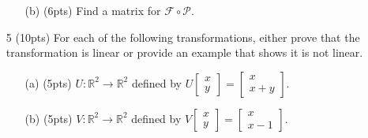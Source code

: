 \documentclass{article}
\newcommand{\R}{\mathbb{R}}
\newcommand{\mat}[1]{\begin{bmatrix}#1\end{bmatrix}}
\begin{document}
\begin{enumerate}
\begin{enumerate}
		\vspace{1in}

		\item[(b) (6pts)] Find a matrix for $\mathcal F\circ \mathcal P$.
			\vspace{5in}
	\end{enumerate}
	\clearpage

	\item[5 (10pts)] For each of the following transformations, either prove that the transformation is linear
		or provide an example that shows it is not linear.
	\begin{enumerate}
		\item[(a) (5pts)] $U:\R^2\to\R^2$ defined by
			$U\mat{x\\y}=\mat{x\\x+y}$.
		\vspace{5in}
		\item[(b) (5pts)] $V:\R^2\to\R^2$ defined by 
			$V\mat{x\\y}=\mat{x\\x-1}$.
	\end{enumerate}
	\clearpage


\end{enumerate}
\end{document}
